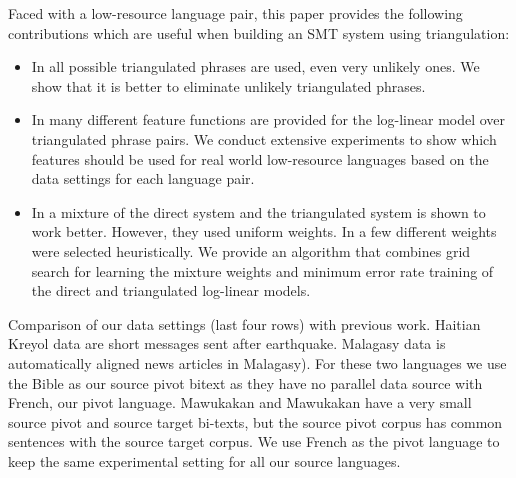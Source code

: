 \documentclass[11pt]{article}
\begin{document}
Faced with a low-resource language pair, this paper provides the following contributions which are useful when building an SMT system using triangulation: 
\begin{itemize}\addtolength{\itemsep}{-0.4\baselineskip}
	\item In \cite{Utiyama:07} all possible triangulated phrases are used, even very unlikely ones. We show that it is better to eliminate unlikely triangulated phrases.
	\item In \cite{Utiyama:07,Cohn:07,Nakovemnlp:12,Ahmed:13} many different feature functions are provided for the log-linear model over triangulated phrase pairs. We conduct extensive experiments to show which features should be used for real world low-resource languages based on the data settings for each language pair.
	\item In \cite{Cohn:07} a mixture of the direct system and the triangulated system is shown to work better. However, they used uniform weights. In \cite{Nakovemnlp:12} a few different weights were selected heuristically. We provide an algorithm that combines grid search for learning the mixture weights and minimum error rate training of the direct and triangulated log-linear models. 
\end{itemize}

\begin{table}[!ht]
	\footnotesize
	\small
	\centering
	
	\caption{Comparison of our data settings (last four rows) with previous work. Haitian Kreyol data are short messages sent after earthquake. Malagasy data is automatically aligned news articles in Malagasy). For these two languages we use the Bible as our source pivot bitext as they have no parallel data source with French, our pivot language. Mawukakan and Mawukakan have a very small source pivot and source target bi-texts, but the source pivot corpus has common sentences with the source target corpus. We use French as the pivot language to keep the same experimental setting for all our source languages.}
	\label{table:datasettings_differences}
\end{table}
\end{document}

